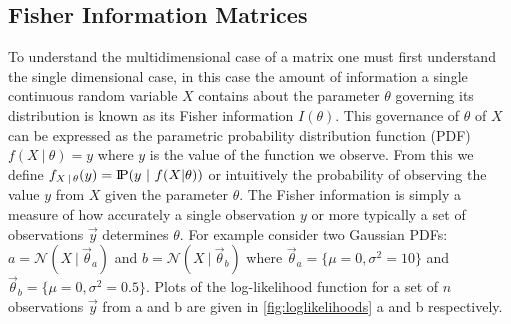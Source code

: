 \subsection{Fisher Information Matrices}
\label{ssec:Bfisherinformation}

To understand the multidimensional case of a matrix one must first understand the single dimensional case, in this case the amount of information a single continuous random variable $X$ contains about the parameter $\theta$ governing its distribution is known as its Fisher information $I(\theta)$. This governance of $\theta$ of $X$ can be expressed as the parametric probability distribution function (PDF) $f(X\ |\ \theta) = y$ where $y$ is the value of the function we observe. From this we define $f_{X\,|\,\theta}(y) = \probP(y\ |\ f(X|\theta))$ or intuitively the probability of observing the value $y$ from $X$ given the parameter $\theta$. The Fisher information is simply a measure of how accurately a single observation $y$ or more typically a set of observations $\vec{y}$ determines $\theta$. For example consider two Gaussian PDFs: $a = \mathcal{N}(X\ |\ \vec{\theta}_a)$ and $b = \mathcal{N}(X\ |\ \vec{\theta}_b)$ where $\vec{\theta}_a = \{\mu=0, \sigma^2=10\}$ and $\vec{\theta}_b = \{\mu=0,\sigma^2=0.5\}$. Plots of the log-likelihood function for a set of $n$ observations $\vec{y}$ from a and b are given in \cref{fig:loglikelihoods} a and b respectively.
